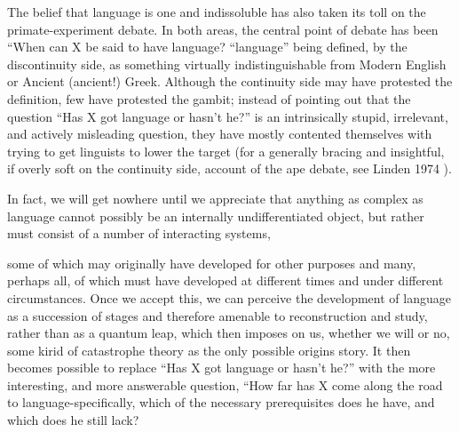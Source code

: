 The belief that language is one and indissoluble has also taken its toll on the primate-experiment debate. In both areas, the central point of debate has been ``When can X be said to have language?{\textquotedbl}\- ``language'' being defined, by the discontinuity side, as something virtually indistinguishable from Modern English or Ancient (ancient!) Greek. Although the continuity side may have protested the definition, few have protested the gambit; instead of pointing out that the ques\-tion ``Has X got language or hasn't he?'' is an intrinsically stupid, irrelevant, and actively misleading question, they have mostly con\-tented themselves with trying to get linguists to lower the target (for a generally bracing and insightful, if overly soft on the continuity side, account of the ape debate, see Linden 1974 ).

In fact, we will get nowhere until we appreciate that anything as complex as language cannot possibly be an internally undifferenti\-ated object, but rather must consist of a number of interacting systems,


some of which may originally have developed for other purposes and many, perhaps all, of which must have developed at different times and under different circumstances. Once we accept this, we can per\-ceive the development of language as a succession of stages and there\-fore amenable to reconstruction and study, rather than as a quantum leap, which then imposes on us, whether we will or no, some kirid of catastrophe theory as the only possible origins story. It then becomes possible to replace ``Has X got language or hasn't he?'' with the more interesting, and more answerable question, ``How far has X come along the road to language-specifically, which of the necessary pre\-requisites does he have, and which does he still lack?{\textquotedbl}

